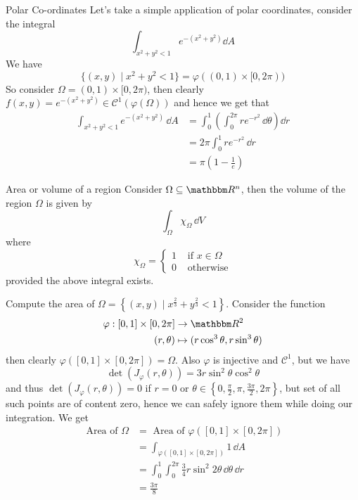 \documentclass[../Analysis-3]{subfiles}
\begin{document}
\begin{Eg}{Polar Co-ordinates}{}
    Let's take a simple application of polar coordinates, consider the integral
    \[
        \int_{x^2 + y^2 < 1} e^{-(x^2+y^2)} \dd A
    \]
    We have
    \[
        \{ (x,y) \mid x^2 + y^2 < 1 \} = \varphi( (0,1) \times [0,2\pi))
    \]
    So consider $\Omega = (0,1) \times [0,2\pi)$, then clearly $f(x,y) = e^{-(x^2+y^2)} \in \mathscr{C}^1(\varphi(\Omega))$ and hence we get that
    \begin{align*}
        \int_{x^2+y^2 < 1} e^{-(x^2+y^2)} \, \dd A & = \int_0^1 \left( \int_0^{2\pi} re^{-r^2} \, \dd \theta \right) \dd r \\
                                                   & = 2\pi \int_0^1 r e^{-r^2} \, \dd r                                   \\
                                                   & = \pi \left( 1 - \frac{1}{e}\right)
    \end{align*}
\end{Eg}

\begin{Def}{Area or volume of a region}{}
    Consider $\Omega \subseteq \R^n$, then the volume of the region $\Omega$ is given by
    \[
        \int_{\Omega} \chi_{\Omega} \, \dd V
    \]
    where
    \[
        \chi_{\Omega} = \begin{cases}
            1 & \mbox{ if } x \in \Omega \\
            0 & \mbox{ otherwise}
        \end{cases}
    \]
    provided the above integral exists.
\end{Def}

\begin{Eg}{}{}
    Compute the area of $\Omega = \left\{ (x,y) \mid x^{\frac{2}{3}} + y^{\frac{2}{3}} < 1 \right\}$. Consider the function
    \begin{align*}
        \varphi : [0,1] \times [0,2\pi] & \to \R^2                                 \\
        (r,\theta)                      & \mapsto ( r\cos^3\theta, r\sin^3\theta )
    \end{align*}
    then clearly $\varphi([0,1] \times [0,2\pi]) = \Omega$. Also $\varphi$ is injective and $\mathscr{C}^1$, but we have
    \[
        \det(J_{\varphi}(r,\theta)) = 3r \sin^2\theta \cos^2\theta
    \]
    and thus $\det(J_{\varphi}(r,\theta)) = 0$ if $r = 0$ or $\theta \in \left\{ 0, \frac{\pi}{2}, \pi, \frac{3\pi}{2}, 2\pi \right\}$, but set of all such points are of content zero, hence we can safely ignore them while doing our integration. We get
    \begin{align*}
        \mbox{ Area of } \Omega & = \mbox{ Area of } \varphi \left( [0,1] \times [0,2\pi] \right)              \\
                                & = \int_{\varphi([0,1] \times [0,2\pi])} 1 \, \dd A                           \\
                                & = \int_0^1 \int_0^{2\pi} \frac{3}{4} r \sin^2 2\theta \, \dd \theta \, \dd r \\
                                & = \frac{3\pi}{8}
    \end{align*}
\end{Eg}
\end{document}
